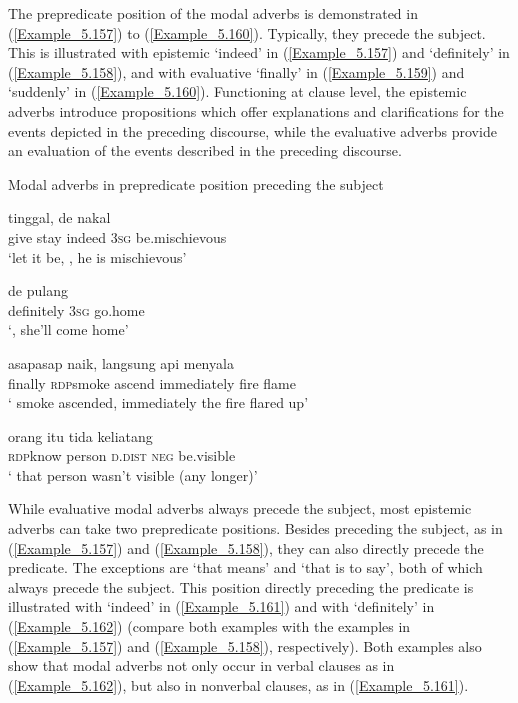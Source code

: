 The prepredicate position of the modal adverbs is demonstrated in (\ref{Example_5.157}) to (\ref{Example_5.160}). Typically, they precede the subject. This is illustrated with epistemic  ‘indeed’ in (\ref{Example_5.157}) and  ‘definitely’ in (\ref{Example_5.158}), and with evaluative  ‘finally’ in (\ref{Example_5.159}) and  ‘suddenly’ in (\ref{Example_5.160}). Functioning at clause level, the epistemic adverbs introduce propositions which offer explanations and clarifications for the events depicted in the preceding discourse, while the evaluative adverbs provide an evaluation of the events described in the preceding discourse.


\begin{styleExampleTitle}
Modal adverbs in prepredicate position preceding the subject
\end{styleExampleTitle}

\ea
\label{Example_5.157}
 {tinggal,} {} {de} {nakal}\\ %
 give  stay  indeed  \textsc{3sg}  be.mischievous\\
\glt 
‘let it be, , he is mischievous’ \textstyleExampleSource{[081015-001-Cv.0027]}
\z

\ea
\label{Example_5.158}
 {de} {pulang}\\ %
 definitely  \textsc{3sg}  go.home\\
\glt 
‘, she’ll come home’ \textstyleExampleSource{[081006-019-Cv.0010]}
\z

\ea
\label{Example_5.159}
 {asap{\Tilde}asap} {naik,} {langsung} {api} {menyala}\\ %
 finally  \textsc{rdp}{\Tilde}smoke  ascend  immediately  fire  flame\\
\glt 
‘ smoke ascended, immediately the fire flared up’ \textstyleExampleSource{[080922-010a-CvNF.0079]}
\z

\ea
\label{Example_5.160}
 {orang} {itu} {tida} {keliatang}\\ %
 \textsc{rdp}{\Tilde}know  person  \textsc{d.dist}  \textsc{neg}  be.visible\\
\glt 
‘ that person wasn’t visible (any longer)’ \textstyleExampleSource{[080922-002-Cv.0123]}
\z


While evaluative modal adverbs always precede the subject, most epistemic adverbs can take two prepredicate positions. Besides preceding the subject, as in (\ref{Example_5.157}) and (\ref{Example_5.158}), they can also directly precede the predicate. The exceptions are  ‘that means’ and  ‘that is to say’, both of which always precede the subject. This position directly preceding the predicate is illustrated with  ‘indeed’ in (\ref{Example_5.161}) and with  ‘definitely’ in (\ref{Example_5.162}) (compare both examples with the examples in (\ref{Example_5.157}) and (\ref{Example_5.158}), respectively). Both examples also show that modal adverbs not only occur in verbal clauses as in (\ref{Example_5.162}), but also in nonverbal clauses, as in (\ref{Example_5.161}).


